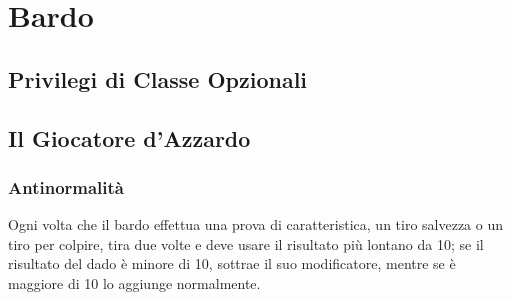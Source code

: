 \chapter{Bardo}

\section{Privilegi di Classe Opzionali}

\section{Il Giocatore d'Azzardo}

\subsection{Antinormalità}

Ogni volta che il bardo effettua una prova di caratteristica, un tiro salvezza o un tiro per colpire, tira due volte e deve usare il risultato più lontano da 10; se il risultato del dado è minore di 10, sottrae il suo modificatore, mentre se è maggiore di 10 lo aggiunge normalmente.

